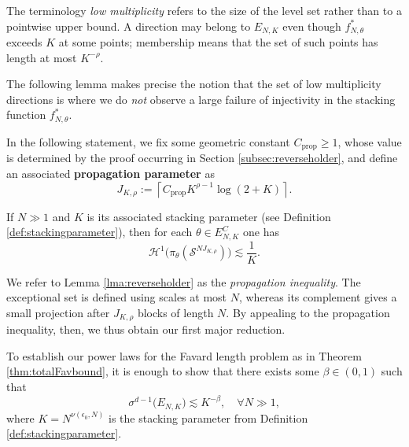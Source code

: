 \documentclass[12pt]{amsart}
\numberwithin{equation}{section}
\begin{document}
The terminology \textit{low multiplicity} refers to the size of the level set rather than to a pointwise upper bound. A direction may belong to $E_{N,K}$ even though $f_{N,\theta}^*$ exceeds $K$ at some points; membership means that the set of such points has length at most $K^{-\rho}$.

The following lemma makes precise the notion that the set of low multiplicity directions is where we do \textit{not} observe a large failure of injectivity in the stacking function $f_{N,\theta}^*$.

\medskip

In the following statement, we fix some geometric constant $C_{\mathrm{prop}}\geq1$, whose value is determined by the proof occurring in Section \ref{subsec:reverseholder}, and define an associated \textbf{propagation parameter} as
\begin{equation}\label{eq:propagationblocks}
J_{K,\rho}:=\left\lceil C_{\mathrm{prop}}K^{\rho-1}\log(2+K)\right\rceil.
\end{equation}

\begin{lemma}\label{lma:reverseholder}
If $N \gg 1$ and $K$ is its associated stacking parameter (see Definition \ref{def:stackingparameter}), then for each $\theta \in E_{N,K}^C$ one has
\begin{equation}\label{eq:propagationconclusion}
\mathcal{H}^1 \big(\pi_{\theta}(\mathcal{S}^{NJ_{K,\rho}}) \big) \lesssim \frac{1}{K}.
\end{equation}
\end{lemma}

We refer to Lemma \ref{lma:reverseholder} as the \textit{propagation inequality}.  The exceptional set is defined using scales at most $N$, whereas its complement gives a small projection after $J_{K,\rho}$ blocks of length $N$. By appealing to the propagation inequality, then, we thus obtain our first major reduction.

\medskip

\begin{proposition}\label{prop:favardreducedtoexceptional}
To establish our power laws for the Favard length problem as in Theorem \ref{thm:totalFavbound}, it is enough to show that there exists some $\beta \in (0,1)$ such that
\begin{equation}\label{eq:smallexceptionalset}
\sigma^{d-1} \big(E_{N,K}\big) \lesssim K^{-\beta}, \quad \forall N \gg 1,
\end{equation}
where $K = N^{\nu (\epsilon_0, N)}$ is the stacking parameter from Definition \ref{def:stackingparameter}.
\end{proposition}
\end{document}
